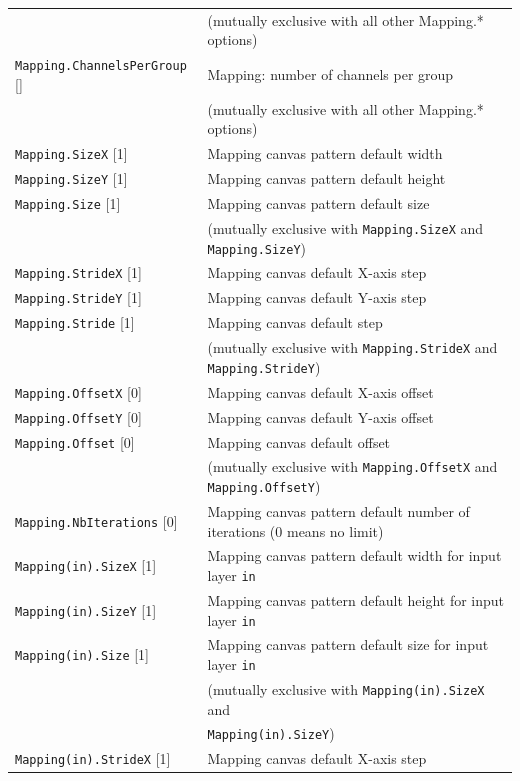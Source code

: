 \documentclass[a4paper,11pt,oneside]{article}
\begin{document}
\begin{center}
\begin{longtable}{| p{5cm} | p{10cm} | }
   & (mutually exclusive with all other Mapping.* options) \\
  \lstinline!Mapping.ChannelsPerGroup! [] & Mapping: number of channels per group \\
   & (mutually exclusive with all other Mapping.* options) \\
  \lstinline!Mapping.SizeX! [1] & Mapping canvas pattern default width \\
  \lstinline!Mapping.SizeY! [1] & Mapping canvas pattern default height \\
  \lstinline!Mapping.Size! [1] & Mapping canvas pattern default size \\
   & (mutually exclusive with \lstinline!Mapping.SizeX!
   and \lstinline!Mapping.SizeY!) \\
  \lstinline!Mapping.StrideX! [1] & Mapping canvas default X-axis step \\
  \lstinline!Mapping.StrideY! [1] & Mapping canvas default Y-axis step \\
  \lstinline!Mapping.Stride! [1] & Mapping canvas default step \\
   & (mutually exclusive with \lstinline!Mapping.StrideX!
   and \lstinline!Mapping.StrideY!) \\
  \lstinline!Mapping.OffsetX! [0] & Mapping canvas default X-axis offset \\
  \lstinline!Mapping.OffsetY! [0] & Mapping canvas default Y-axis offset \\
  \lstinline!Mapping.Offset! [0] & Mapping canvas default offset \\
   & (mutually exclusive with \lstinline!Mapping.OffsetX!
   and \lstinline!Mapping.OffsetY!) \\
  \lstinline!Mapping.NbIterations! [0] & Mapping canvas pattern default number
  of iterations (0 means no limit) \\
  \lstinline!Mapping(in).SizeX! [1] & Mapping canvas pattern default width
  for input layer \lstinline!in! \\
  \lstinline!Mapping(in).SizeY! [1] & Mapping canvas pattern default height
  for input layer \lstinline!in! \\
  \lstinline!Mapping(in).Size! [1] & Mapping canvas pattern default size
  for input layer \lstinline!in! \\
   & (mutually exclusive with \lstinline!Mapping(in).SizeX! and \\
   & \lstinline!Mapping(in).SizeY!) \\
  \lstinline!Mapping(in).StrideX! [1] & Mapping canvas default X-axis step

\end{longtable}
\end{center}
\end{document}
